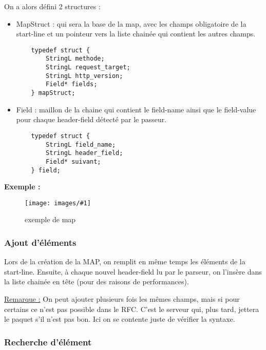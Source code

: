 \documentclass{article}
\newcommand{\image}[4]{\begin{figure}[H]\begin{center}\texttt{[image: images/\#1]}\caption{#2}\end{center}\end{figure}\label{fig#4}}
\begin{document}
                On a alors défini 2 structures :
                \begin{itemize}
                    \item MapStruct : qui sera la base de la map, avec les champs obligatoire de la start-line et un pointeur vers la liste chainée qui contient les autres champs.
                    \begin{lstlisting}
    typedef struct {
        StringL methode;
        StringL request_target;
        StringL http_version;
        Field* fields;
    } mapStruct;
                    \end{lstlisting}
                    \item Field : maillon de la chaine qui contient le field-name  ainsi que le field-value pour chaque header-field détecté par le passeur.
                    \begin{lstlisting}
    typedef struct {
        StringL field_name;
        StringL header_field;
        Field* suivant;
    } field;
                    \end{lstlisting}
                \end{itemize}
                
                \textbf{Exemple :}
                
                \image{ExempleMap.png}{exemple de map}{0.55}{1}
                
            \subsubsection{Ajout d’éléments}
                
                Lors de la création de la MAP, on remplit en même temps les éléments de la start-line. Ensuite, à chaque nouvel header-field lu par le parseur, on l’insère dans la liste chainée en tête (pour des raisons de performances).
                
                \underline{Remarque :} On peut ajouter plusieurs fois les mêmes champs, mais si pour certains ce n’est pas possible dans le RFC. C’est le serveur qui, plus tard, jettera le paquet s’il n’est pas bon. Ici on se contente juste de vérifier la syntaxe.
                
            \subsubsection{Recherche d’élément}
            
\end{document}
